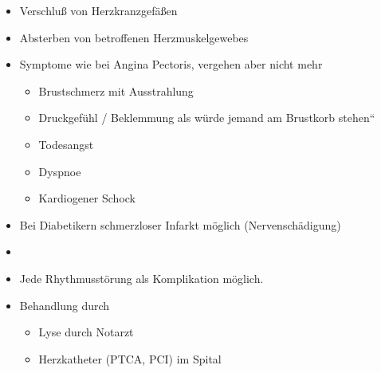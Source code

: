 {\begin{itemize}
    \item Verschluß von Herzkranzgefäßen
    \item Absterben von betroffenen Herzmuskelgewebes
    \item Symptome wie bei Angina Pectoris, vergehen aber nicht
    mehr
    \begin{itemize}
        \item Brustschmerz mit Ausstrahlung
        \item Druckgefühl / Beklemmung {\quotedblbase}als würde jemand am
        Brustkorb stehen{\textquotedblleft}
        \item Todesangst
        \item Dyspnoe
        \item Kardiogener Schock
    \end{itemize}
    \item Bei Diabetikern schmerzloser Infarkt möglich
    (Nervenschädigung)
    \item {}
    \item Jede Rhythmusstörung als Komplikation möglich.
    \item Behandlung durch
    \begin{itemize}
        \item Lyse durch Notarzt
        \item Herzkatheter (PTCA, PCI) im Spital
    \end{itemize}
\end{itemize}
}

\begin{center}
 

\end{center}

